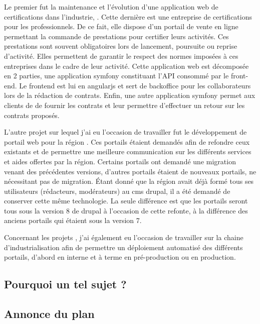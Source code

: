 Le premier fut la maintenance et l'évolution d'une application web de certifications dans l'industrie, \bv. Cette dernière est une entreprise de certifications pour les professionnels. De ce fait, elle dispose d’un portail de vente en ligne permettant la commande de prestations pour certifier leurs activités. Ces prestations sont souvent obligatoires lors de lancement, poursuite ou reprise d'activité. Elles permettent de garantir le respect des normes imposées à ces entreprises dans le cadre de leur activité. Cette application web est décomposée en 2 parties, une application \gls{symfony} constituant l'\gls{API} consommé par le front-end. Le \gls{frontend} est lui en \gls{angularjs} et sert de \gls{backoffice} pour les collaborateurs \bv{} lors de la rédaction de contrats. Enfin, une autre application \gls{symfony} permet aux clients de \bv{} de fournir les contrats et leur permettre d'effectuer un retour sur les contrats proposés.

L'autre projet sur lequel j'ai eu l'occasion de travailler fut le développement de portail web pour la région \naq{}. Ces portails étaient demandés afin de refondre ceux existants et de permettre une meilleure communication sur les différents services et aides offertes par la région. Certains portails ont demandé une migration venant des précédentes versions, d'autres portails étaient de nouveaux portails, ne nécessitant pas de migration. Étant donné que la région avait déjà formé tous ses utilisateurs (rédacteurs, modérateurs) au \gls{cms} \gls{drupal}, il a été demandé de conserver cette même technologie. La seule différence est que les portails seront tous sous la version 8 de \gls{drupal} à l'occasion de cette refonte, à la différence des anciens portails qui étaient sous la version 7.

Concernant les projets \naq, j'ai également eu l'occasion de travailler sur la chaine d'industrialisation afin de permettre un déploiement automatisé des différents portails, d'abord en interne et à terme en pré-production ou en production.

\subsection*{Pourquoi un tel sujet ?}


\subsection*{Annonce du plan}

